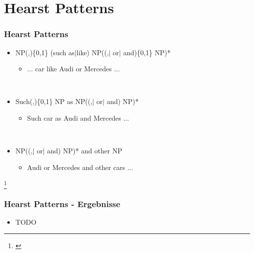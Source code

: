 \section{Hearst Patterns}
\label{sec:hearst-patterns}

\begin{frame}
  \frametitle{Hearst Patterns}

  \begin{itemize}
  \item NP(,)\{0,1\} (such as$\vert$like)
    NP((,$\vert$ or$\vert$ and)\{0,1\} NP)*
    \begin{itemize}
    \item ... car like Audi or Mercedes ...
    \end{itemize}~\\

  \item Such(,)\{0,1\} NP as NP((,$\vert$ or$\vert$ and) NP)*
    \begin{itemize}
    \item Such car as Audi and Mercedes ...
    \end{itemize}~\\

  \item NP((,$\vert$ or$\vert$ and) NP)* and  other NP
    \begin{itemize}
    \item Audi or Mercedes and other cars ...
    \end{itemize}

  \end{itemize}

  \let\thefootnote\relax\footnote{\cite{Hearst:1992}}
\end{frame}

\begin{frame}
  \frametitle{Hearst Patterns - Ergebnisse}

  \begin{itemize}
  \item TODO
  \end{itemize}
\end{frame}

